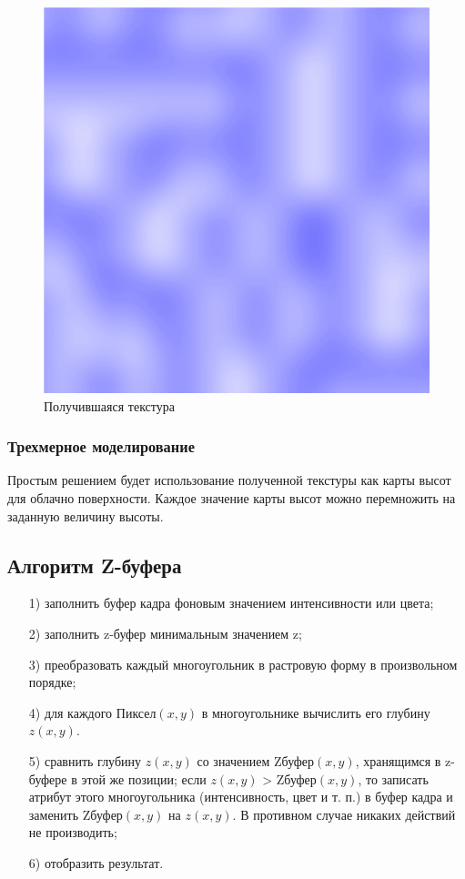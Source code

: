 \documentclass[14pt, a4paper]{extarticle}
\begin{document}
\begin{figure}[h!]
	\centering
	\includegraphics[scale=0.5]{source/perlin}
	\caption{Получившаяся текстура}
	\label{perlin}
\end{figure}\par
\subsubsection{Трехмерное моделирование}
Простым решением будет использование полученной текстуры как карты высот для облачно поверхности. Каждое значение карты высот можно перемножить на заданную величину высоты.
\subsection{Алгоритм Z-буфера}
\begin{enumerate}
	\item[1)] заполнить буфер кадра фоновым значением интенсивности или цвета;
	\item[2)] заполнить z-буфер минимальным значением z;
	\item[3)] преобразовать каждый многоугольник в растровую форму в произвольном порядке;
	\item[4)] для каждого Пиксел$(x,y)$ в многоугольнике вычислить его глубину $z(x,y)$.
	\item[5)] сравнить глубину $z(x,y)$ со значением Zбуфер$(x,y)$, хранящимся в z-буфере в этой же позиции;
	\subitem если $z(x,y)$ > Zбуфер$(x,y)$, то записать атрибут этого многоугольника (интенсивность, цвет и т. п.) в буфер кадра и заменить Zбуфер$(x,y)$ на $z(x,y)$. В противном случае никаких действий не производить;
	\item[6)] отобразить результат.
\end{enumerate}
\end{document}
